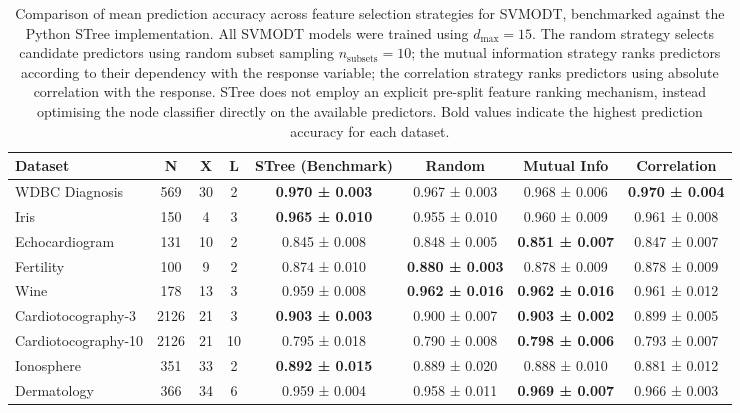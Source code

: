 \begin{table}
\centering
\caption{\label{tab:svmodt-feature-selection-table-latex}Comparison of mean prediction accuracy across feature selection strategies for SVMODT, benchmarked against the Python STree implementation. All SVMODT models were trained using \(d_{\max}=15\). The random strategy selects candidate predictors using random subset sampling \(n_{\text{subsets}} = 10\); the mutual information strategy ranks predictors according to their dependency with the response variable; the correlation strategy ranks predictors using absolute correlation with the response. STree does not employ an explicit pre-split feature ranking mechanism, instead optimising the node classifier directly on the available predictors. Bold values indicate the highest prediction accuracy for each dataset.}
\centering
\fontsize{8}{10}\selectfont
\begin{tabular}[t]{l|c|c|c|c|c|c|c}
\hline
Dataset & N & X & L & STree (Benchmark) & Random & Mutual Info & Correlation\\
\hline
WDBC Diagnosis & 569 & 30 & 2 & \textbf{0.970 ± 0.003} & 0.967 ± 0.003 & 0.968 ± 0.006 & \textbf{0.970 ± 0.004}\\
\hline
Iris & 150 & 4 & 3 & \textbf{0.965 ± 0.010} & 0.955 ± 0.010 & 0.960 ± 0.009 & 0.961 ± 0.008\\
\hline
Echocardiogram & 131 & 10 & 2 & 0.845 ± 0.008 & 0.848 ± 0.005 & \textbf{0.851 ± 0.007} & 0.847 ± 0.007\\
\hline
Fertility & 100 & 9 & 2 & 0.874 ± 0.010 & \textbf{0.880 ± 0.003} & 0.878 ± 0.009 & 0.878 ± 0.009\\
\hline
Wine & 178 & 13 & 3 & 0.959 ± 0.008 & \textbf{0.962 ± 0.016} & \textbf{0.962 ± 0.016} & 0.961 ± 0.012\\
\hline
Cardiotocography-3 & 2126 & 21 & 3 & \textbf{0.903 ± 0.003} & 0.900 ± 0.007 & \textbf{0.903 ± 0.002} & 0.899 ± 0.005\\
\hline
Cardiotocography-10 & 2126 & 21 & 10 & 0.795 ± 0.018 & 0.790 ± 0.008 & \textbf{0.798 ± 0.006} & 0.793 ± 0.007\\
\hline
Ionosphere & 351 & 33 & 2 & \textbf{0.892 ± 0.015} & 0.889 ± 0.020 & 0.888 ± 0.010 & 0.881 ± 0.012\\
\hline
Dermatology & 366 & 34 & 6 & 0.959 ± 0.004 & 0.958 ± 0.011 & \textbf{0.969 ± 0.007} & 0.966 ± 0.003\\
\hline
\end{tabular}
\end{table}

